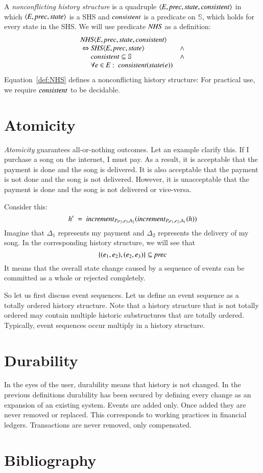 \documentclass{elsarticle}
\def\id#1{\text{\em #1\/}}
\def\Events{{\mathit E}}
\begin{document}
	A {\em nonconflicting history structure} is a quadruple $\la\Events, \id{prec}, \id{state}, \id{consistent}\ra$ in which
	$\la \Events, \id{prec}, \id{state}\ra$ is a SHS and $\id{consistent}$ is a predicate on $\mathbb S$,
	which holds for every state in the SHS.
	We will use predicate $\id{NHS}$ as a definition:
\begin{equation}
\begin{array}{l@{}ll}
	\multicolumn{3}{l}{\id{NHS}\la \Events, \id{prec}, \id{state}, \id{consistent}\ra}\\
	\ \Leftrightarrow\ &\id{SHS}\la \Events, \id{prec}, \id{state}\ra&\wedge\\
	&\id{consistent}\subseteq\mathbb S&\wedge\\
	&\forall e\in\Events:\ \id{consistent}(\id{state}(e))&
\end{array}
\label{def:NHS}
\end{equation}
	Equation~\ref{def:NHS} defines a nonconflicting history structure:
	For practical use, we require $\id{consistent}$ to be decidable.

\section{Atomicity}
\label{sct:Atomicity}
	{\em Atomicity} guarantees all-or-nothing outcomes.
	Let an example clarify this.
	If I purchase a song on the internet, I must pay.
	As a result, it is acceptable that the payment is done and the song is delivered.
	It is also acceptable that the payment is not done and the song is not delivered.
	However, it is unacceptable that the payment is done and the song is not delivered or vice-versa.

	Consider this:
	\[h'\ =\ \id{increment}_{P,e_2,e_3,\Delta_2}(\id{increment}_{P,e_1,e_2,\Delta_1}(h))\]
	Imagine that $\Delta_1$ represents my payment and $\Delta_2$ represents the delivery of my song.
	In the corresponding history structure, we will see that
	\[\{(e_1,e_2), (e_2,e_3)\}\subseteq\id{prec} \]
	It means that the overall state change caused by a sequence of events can be committed as a whole or rejected completely.

	So let us first discuss event sequences.
	Let us define an event sequence as a totally ordered history structure.
	Note that a history structure that is not totally ordered may contain multiple historic substructures
	that are totally ordered.
	Typically, event sequences occur multiply in a history structure.

\section{Durability}
\label{sct:Durability}
	In the eyes of the user, durability means that history is not changed.
	In the previous definitions durability has been secured by defining every change as an expansion of an existing system.
	Events are added only. Once added they are never removed or replaced.
	This corresponds to working practices in financial ledgers.
	Transactions are never removed, only compensated.

\section{Bibliography}


\end{document}
